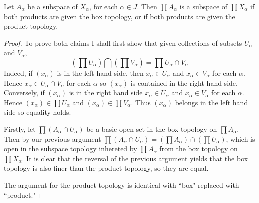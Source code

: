 \documentclass[12pt, a4paper, oneside, openright, titlepage]{book}
\begin{document}
\begin{theorem}
    Let $A_{\alpha}$ be a subspace of $X_{\alpha}$, for each $\alpha \in J$. Then $\prod A_{\alpha}$ is a subspace of $\prod X_{\alpha}$ if both products are given the box topology, or if both products are given the product topology.
\end{theorem}
\begin{proof}
    To prove both claims I shall first show that given collections of subsets $U_{\alpha}$ and $V_{\alpha}$, \begin{equation*}
        \left(\prod U_{\alpha}\right)\bigcap\left(\prod V_{\alpha}\right) = \prod U_{\alpha}\cap V_{\alpha}
    \end{equation*}
    Indeed, if $(x_{\alpha})$ is in the left hand side, then $x_{\alpha} \in U_{\alpha}$ and $x_{\alpha} \in V_{\alpha}$ for each $\alpha$. Hence $x_{\alpha} \in U_{\alpha}\cap V_{\alpha}$ for each $\alpha$ so $(x_{\alpha})$ is contained in the right hand side. Conversely, if $(x_{\alpha})$ is in the right hand side $x_{\alpha} \in U_{\alpha}$ and $x_{\alpha} \in V_{\alpha}$ for each $\alpha$. Hence $(x_{\alpha}) \in \prod U_{\alpha}$ and $(x_{\alpha}) \in \prod V_{\alpha}$. Thus $(x_{\alpha})$ belongs in the left hand side so equality holds.

    Firstly, let $\prod (A_{\alpha}\cap U_{\alpha})$ be a basic open set in the box topology on $\prod A_{\alpha}$. Then by our previous argument $\prod (A_{\alpha}\cap U_{\alpha}) = \left(\prod A_{\alpha}\right)\cap\left(\prod U_{\alpha}\right)$, which is open in the subspace topology inhereted by $\prod A_{\alpha}$ from the box topology on $\prod X_{\alpha}$. It is clear that the reversal of the previous argument yields that the box topology is also finer than the product topology, so they are equal.

    The argument for the product topology is identical with ``box" replaced with ``product."
\end{proof}
\end{document}
